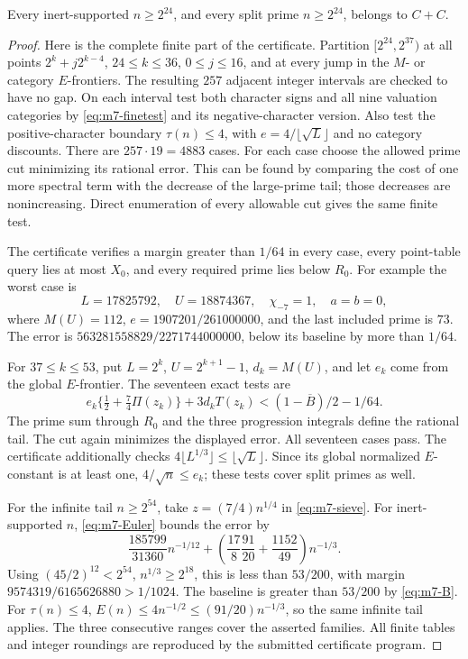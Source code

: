 \begin{lemma}\label{lem:m7-intervals}
Every inert-supported \(n\ge2^{24}\), and every split prime
\(n\ge2^{24}\), belongs to \(C+C\).
\end{lemma}

\begin{proof}
Here is the complete finite part of the certificate.
Partition \([2^{24},2^{37})\) at all points
\(2^k+j2^{k-4}\), \(24\le k\le36\), \(0\le j\le16\),
and at every jump in the \(M\)- or category \(E\)-frontiers.
The resulting \(257\) adjacent integer intervals are checked to
have no gap. On each interval test both character signs and
all nine valuation categories by \eqref{eq:m7-finetest} and its
negative-character version. Also test the positive-character
boundary \(\tau(n)\le4\), with \(e=4/\lfloor\sqrt L\rfloor\)
and no category discounts. There are \(257\cdot19=4883\) cases.
For each case choose the allowed prime cut minimizing its rational
error. This can be found by comparing the cost of one more
spectral term with the decrease of the large-prime tail; those
decreases are nonincreasing. Direct enumeration of every allowable
cut gives the same finite test.

The certificate verifies a margin greater than \(1/64\) in every
case, every point-table query lies at most \(X_0\), and every
required prime lies below \(R_0\). For example the worst case is
\[
 L=17825792,\quad U=18874367,\quad \chi_{-7}=1,\quad a=b=0,
\]
where \(M(U)=112\), \(e=1907201/261000000\), and the last included
prime is \(73\). The error is
\(563281558829/2271744000000\), below its baseline by more than
\(1/64\).

For \(37\le k\le53\), put \(L=2^k\), \(U=2^{k+1}-1\),
\(d_k=M(U)\), and let \(e_k\) come from the global \(E\)-frontier.
The seventeen exact tests are
\begin{equation}
 e_k\{\tfrac12+\tfrac74\Pi(z_k)\}+3d_kT(z_k)
                      <(1-\overline B)/2-1/64.                \label{eq:m7-highbins}
\end{equation}
The prime sum through \(R_0\) and the three progression integrals
define the rational tail. The cut again minimizes the displayed
error. All seventeen cases pass. The certificate additionally
checks \(4\lfloor L^{1/3}\rfloor\le\lfloor\sqrt L\rfloor\).
Since its global normalized \(E\)-constant is at least one,
\(4/\sqrt n\le e_k\); these tests cover split primes as well.

For the infinite tail \(n\ge2^{54}\), take
\(z=(7/4)n^{1/4}\) in \eqref{eq:m7-sieve}.
For inert-supported \(n\), \eqref{eq:m7-Euler} bounds the error by
\[
 \frac{185799}{31360}n^{-1/12}
      +\left(\frac{17}{8}\frac{91}{20}+\frac{1152}{49}\right)n^{-1/3}.
\]
Using \((45/2)^{12}<2^{54}\), \(n^{1/3}\ge2^{18}\), this is
less than \(53/200\), with margin
\(9574319/6165626880>1/1024\).
The baseline is greater than \(53/200\) by \eqref{eq:m7-B}.
For \(\tau(n)\le4\), \(E(n)\le4n^{-1/2}\le(91/20)n^{-1/3}\),
so the same infinite tail applies. The three consecutive ranges
cover the asserted families. All finite tables and integer
roundings are reproduced by the submitted certificate program.
\end{proof}

